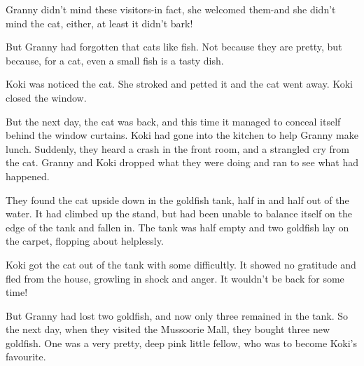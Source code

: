 \par
Granny didn't mind these visitors-in fact, she welcomed them-and she didn't mind the cat, either, at least it didn't bark!
\par
But Granny had forgotten that cats like fish. Not because they are pretty, but because, for a cat, even a small fish is a tasty dish.
\par
Koki was noticed the cat. She stroked and petted it and the cat went away. Koki closed the window.
\par
But the next day, the cat was back, and this time it managed to conceal itself behind the window curtains. Koki had gone into the kitchen to help Granny make lunch. Suddenly, they heard a crash in the front room, and a strangled cry from the cat. Granny and Koki dropped what they were doing and ran to see what had happened.
\par
They found the cat upside down in the goldfish tank, half in and half out of the water. It had climbed up the stand, but had been unable to balance itself on the edge of the tank and fallen in. The tank was half empty and two goldfish lay on the carpet, flopping about helplessly.
\par
Koki got the cat out of the tank with some difficultly. It showed no gratitude and fled from the house, growling in shock and anger. It wouldn't be back for some time!
\par
But Granny had lost two goldfish, and now only three remained in the tank. So the next day, when they visited the Mussoorie Mall, they bought three new goldfish. One was a very pretty, deep pink little fellow, who was to become Koki's favourite.





